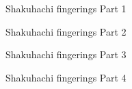 \begin{figure}[H]
	\centering
	\caption{Shakuhachi fingerings Part 1}
	\label{fig:shakuhachi_fingerings_1}
\end{figure}

\begin{figure}[H]
	\centering
	\caption{Shakuhachi fingerings Part 2}
	\label{fig:shakuhachi_fingerings_2}
\end{figure}

\begin{figure}[H]
	\centering
	\caption{Shakuhachi fingerings Part 3}
	\label{fig:shakuhachi_fingerings_3}
\end{figure}

\begin{figure}[H]
	\centering
	\caption{Shakuhachi fingerings Part 4}
	\label{fig:shakuhachi_fingerings_4}
\end{figure}

